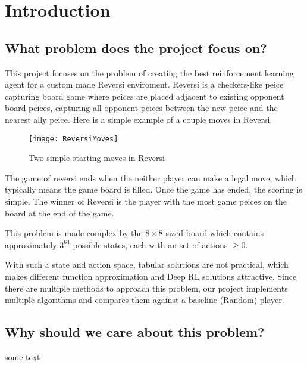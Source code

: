\documentclass[../report.tex]{subfiles}
\begin{document}
\section{Introduction}
\label{introduction}

\subsection{What problem does the project focus on?}
\label{What problem does the project focus on?}

This project focuses on the problem of creating the best reinforcement learning agent for a custom made Reversi enviroment.
Reversi is a checkers-like peice capturing board game where peices are placed adjacent to existing opponent board peices, capturing all opponent peices between the new peice and the nearest ally peice.
Here is a simple example of a couple moves in Reversi.
\begin{figure}[h]
    \centering
    \texttt{[image: ReversiMoves]}
    \caption{Two simple starting moves in Reversi}
\end{figure}
The game of reversi ends when the neither player can make a legal move, which typically means the game board is filled.
Once the game has ended, the scoring is simple. The winner of Reversi is the player with the most game peices on the board at the end of the game.

This problem is made complex by the $8\times8$ sized board which contains approximately $3^{64}$ possible states, 
each with an set of actions $\geq0$.

With such a state and action space, tabular solutions are not practical, which makes different function approximation and Deep RL solutions attractive.
Since there are multiple methods to approach this problem, our project implements multiple algorithms and compares them against a baseline (Random) player.


\subsection{Why should we care about this problem?}
\label{Why should we care about this problem?}
    some text
\end{document}
